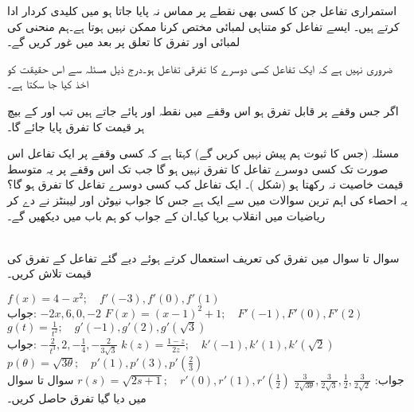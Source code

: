 استمراری تفاعل جن کا کسی بھی نقطے پر مماس نہ پایا جاتا ہو  میں کلیدی کردار ادا کرتے ہیں۔ ایسے تفاعل کو متناہی لمبائی مختص کرنا ممکن نہیں ہوتا ہے۔ہم منحنی کی لمبائی اور تفرق کا تعلق پر بعد میں غور کریں گے۔

ضروری نہیں ہے کہ ایک تفاعل کسی دوسرے کا تفرقی تفاعل ہو۔درج ذیل مسئلہ سے اس حقیقت کو اخذ کیا جا سکتا ہے۔

اگر جس وقفے پر  قابل تفرق ہو اس وقفے میں نقطہ  اور  پائے جاتے ہیں تب   اور  کے بیچ ہر قیمت کا تفرق  پایا جائے گا۔ 

مسئلہ  (جس کا ثبوت ہم پیش نہیں کریں گے)  کہتا ہے کہ کسی وقفے پر ایک تفاعل اس صورت تک کسی دوسرے تفاعل کا تفرق نہیں ہو گا جب تک اس وقفے پر یہ متوسط قیمت خاصیت نہ رکھتا ہو (شکل )۔ ایک تفاعل کب کسی دوسرے تفاعل کا تفرق ہو گا؟ یہ احصاء کی اہم ترین سوالات میں سے ایک ہے جس کا جواب نیوٹن اور لیبنٹز نے دے کر ریاضیات میں انقلاب برپا کیا۔ان کے جواب کو ہم باب  میں دیکھیں گے۔

\\
سوال  تا سوال  میں تفرق کی تعریف استعمال کرتے ہوئے دیے گئے تفاعل کے تفرق کی قیمت تلاش کریں۔  

\quad
$f(x)=4-x^2; \quad f'(-3), f'(0), f'(1)$\\
جواب:\quad
$-2x,6,0,-2$
$F(x)=(x-1)^2+1;\quad F'(-1), F'(0), F'(2)$
$g(t)=\tfrac{1}{t^2};\quad g'(-1), g'(2), g'(\sqrt{3})$\\
جواب:\quad
$-\tfrac{2}{t^3},2,-\tfrac{1}{4},-\tfrac{2}{3\sqrt{3}}$
$k(z)=\tfrac{1-z}{2z};\quad k'(-1), k'(1), k'(\sqrt{2})$
$p(\theta)=\sqrt{3\theta};\quad p'(1), p'(3), p'(\tfrac{2}{3})$\\
جواب:\quad
$\tfrac{3}{2\sqrt{3\theta}},\tfrac{3}{2\sqrt{3}},\tfrac{1}{2},\tfrac{3}{2\sqrt{2}}$
\quad
$r(s)=\sqrt{2s+1};\quad r'(0), r'(1), r'(\tfrac{1}{2})$
سوال  تا سوال  میں دیا گیا تفرق حاصل کریں۔

